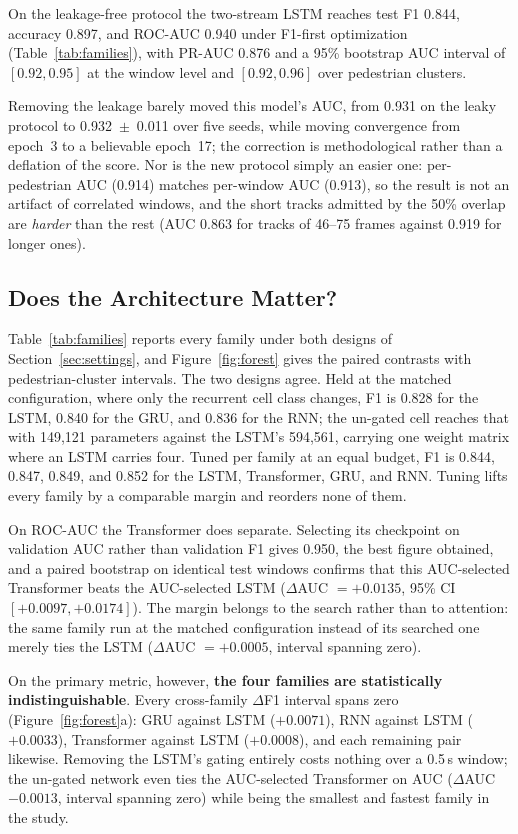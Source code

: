 \documentclass[mti,article,submit,moreauthors]{Definitions/mdpi}
\begin{document}
On the leakage-free protocol the two-stream LSTM reaches test F1 0.844, accuracy 0.897, and ROC-AUC 0.940 under F1-first optimization (Table~\ref{tab:families}), with PR-AUC 0.876 and a 95\% bootstrap AUC interval of $[0.92, 0.95]$ at the window level and $[0.92, 0.96]$ over pedestrian clusters.

Removing the leakage barely moved this model's AUC, from 0.931 on the leaky protocol to 0.932~$\pm$~0.011 over five seeds, while moving convergence from epoch~3 to a believable epoch~17; the correction is methodological rather than a deflation of the score. Nor is the new protocol simply an easier one: per-pedestrian AUC (0.914) matches per-window AUC (0.913), so the result is not an artifact of correlated windows, and the short tracks admitted by the 50\% overlap are \emph{harder} than the rest (AUC 0.863 for tracks of 46--75 frames against 0.919 for longer ones).

\subsection{Does the Architecture Matter?}
\label{sec:architecture}

Table~\ref{tab:families} reports every family under both designs of Section~\ref{sec:settings}, and Figure~\ref{fig:forest} gives the paired contrasts with pedestrian-cluster intervals. The two designs agree. Held at the matched configuration, where only the recurrent cell class changes, F1 is 0.828 for the LSTM, 0.840 for the GRU, and 0.836 for the RNN; the un-gated cell reaches that with 149,121 parameters against the LSTM's 594,561, carrying one weight matrix where an LSTM carries four. Tuned per family at an equal budget, F1 is 0.844, 0.847, 0.849, and 0.852 for the LSTM, Transformer, GRU, and RNN. Tuning lifts every family by a comparable margin and reorders none of them.

On ROC-AUC the Transformer does separate. Selecting its checkpoint on validation AUC rather than validation F1 gives 0.950, the best figure obtained, and a paired bootstrap on identical test windows confirms that this AUC-selected Transformer beats the AUC-selected LSTM ($\Delta$AUC $= +0.0135$, 95\% CI $[+0.0097, +0.0174]$). The margin belongs to the search rather than to attention: the same family run at the matched configuration instead of its searched one merely ties the LSTM ($\Delta$AUC $= +0.0005$, interval spanning zero).

On the primary metric, however, \textbf{the four families are statistically indistinguishable}. Every cross-family $\Delta$F1 interval spans zero (Figure~\ref{fig:forest}a): GRU against LSTM ($+0.0071$), RNN against LSTM ($+0.0033$), Transformer against LSTM ($+0.0008$), and each remaining pair likewise. Removing the LSTM's gating entirely costs nothing over a 0.5\,s window; the un-gated network even ties the AUC-selected Transformer on AUC ($\Delta$AUC $-0.0013$, interval spanning zero) while being the smallest and fastest family in the study.
\end{document}
